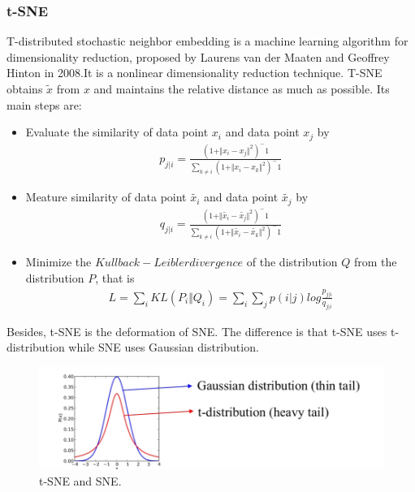 \documentclass{article}
\begin{document}
\subsubsection{t-SNE}
\indent T-distributed stochastic neighbor embedding is a machine learning algorithm for dimensionality reduction, proposed by Laurens van der Maaten and Geoffrey Hinton in 2008.\cite{maaten2008visualizing}It is a nonlinear dimensionality reduction technique. T-SNE obtains $\tilde{x}$ from $x$ and maintains the relative distance as much as possible. Its main steps are:
\begin{itemize}
	\item  Evaluate the similarity of data point $x_i$ and data point $x_j$ by
	\begin{eqnarray}
	p_{j|i}=\frac{(1+\Vert x_i-x_j \Vert^2)^-1}{\sum_{k\neq i}(1+\Vert x_i-x_k \Vert^2)^-1}
	\end{eqnarray}
	
	\item  Meature similarity of data point $\tilde{x_i}$ and data point $\tilde{x_j}$ by
	\begin{eqnarray}
	q_{j|i}=\frac{(1+\Vert \tilde{x_i}-\tilde{x_j} \Vert^2)^-1}{\sum_{k\neq i}(1+\Vert \tilde{x_i}-\tilde{x_k} \Vert^2)^-1}
	\end{eqnarray}
	
	\item  Minimize the $Kullback-Leibler divergence$ of the distribution $Q$ from the distribution $P$, that is
	\begin{eqnarray}
	L = \sum_{i}KL(P_i\Vert Q_i)=\sum_{i}\sum_{j}p(i|j)log\frac{p_{j|i}}{q_{j|i}}
	\end{eqnarray}
\end{itemize}

\indent Besides, t-SNE is the deformation of SNE. The difference is that t-SNE uses t-distribution while SNE uses Gaussian distribution.
\begin{figure}[htbp]
	\centering
	\includegraphics[scale=0.3]{figure/SNE.jpg}
	\caption{t-SNE and SNE.}
	\label{fig:SNE}
\end{figure}\par
\end{document}
